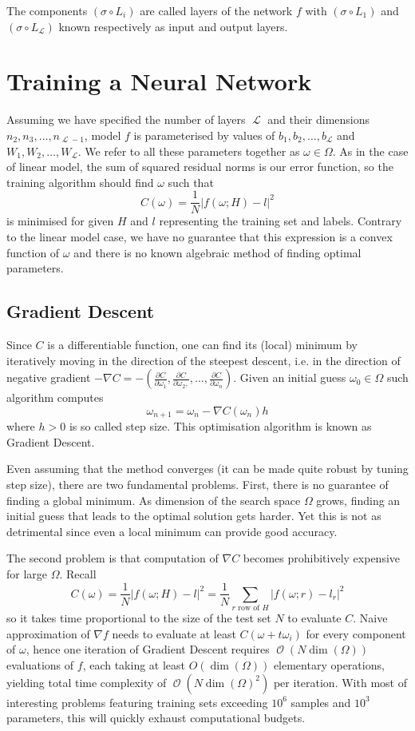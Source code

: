 \documentclass[a4paper,11pt]{article}
\theoremstyle{break}
\DeclareMathOperator{\La}{\mathcal{L}}
\DeclareMathOperator{\bO}{\mathcal{O}}
\begin{document}
The components $ (\sigma \circ L_{i}) $ are called layers of the network $f$ with $ (\sigma \circ L_{1}) $ and $ (\sigma \circ L_{\La}) $ known respectively as input and output layers.

\section{Training a Neural Network}

Assuming we have specified the number of layers $ \La $ and their dimensions $ n_2, n_3, \ldots, n_{\La-1} $, model $f$ is parameterised by values of $ b_1, b_2, \ldots, b_{\La} $ and $ W_1, W_2, \ldots, W_{\La} $.
We refer to all these parameters together as $ \omega \in \Omega $.
As in the case of linear model, the sum of squared residual norms is our error function, so the training algorithm should find $ \omega $ such that
    $$ C(\omega) =  \frac{1}{N} | f(\omega; H) - l |^2  $$
is minimised for given $H$ and $l$ representing the training set and labels.
Contrary to the linear model case, we have no guarantee that this expression is a convex function of $ \omega $ and there is no known algebraic method of finding optimal parameters.

\subsection{Gradient Descent}
Since $C$ is a differentiable function, one can find its (local) minimum by iteratively moving in the direction of the steepest descent, i.e. in the direction of negative gradient
$ - \nabla C  = - ( \frac{\partial C}{\partial \omega_1}, \frac{\partial C}{\partial \omega_2, }, ..., \frac{\partial C}{\partial \omega_n})$.
Given an initial guess $\omega_0 \in \Omega$ such algorithm computes
    $$ \omega_{n+1} = \omega_{n} - \nabla C (\omega_n) h $$
where $h > 0$ is so called step size. This optimisation algorithm is known as Gradient Descent.

Even assuming that the method converges (it can be made quite robust by tuning step size), there are two fundamental problems. First, there is no guarantee of finding a global minimum. As dimension of the search space $ \Omega $ grows, finding an initial guess that leads to the optimal solution gets harder. Yet this is not as detrimental since even a local minimum can provide good accuracy.

The second problem is that computation of $\nabla C$ becomes prohibitively expensive for large $ \Omega $. Recall
    $$ C(\omega) =  \frac{1}{N} | f(\omega; H) - l |^2 =
       \frac{1}{N} \sum_{r \text{ row of } H} | f(\omega; r) - l_r |^2 $$
so it takes time proportional to the size of the test set $N$ to evaluate $C$.
Naive approximation of $ \nabla f$ needs to evaluate at least $C(\omega + t \omega_i)$ for every component of $ \omega $, hence one iteration of Gradient Descent requires $ \bO( N  \dim(\Omega) ) $ evaluations of $f$,
each taking at least $ O( \dim(\Omega))$ elementary operations, yielding total time complexity of $ \bO( N \dim(\Omega)^2)$ per iteration. With most of interesting problems featuring training sets exceeding $ 10^6 $ samples and $ 10^3 $ parameters, this will quickly exhaust computational budgets.
\end{document}
